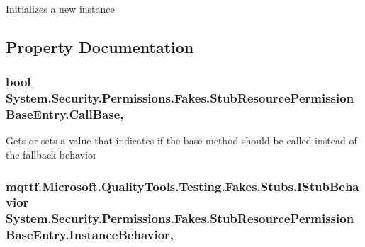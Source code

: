 Initializes a new instance



\subsection{Property Documentation}
\hypertarget{class_system_1_1_security_1_1_permissions_1_1_fakes_1_1_stub_resource_permission_base_entry_aef8fe02ddb10c12f2c7fb5cab6f1fb39}{
\subsubsection[{Call\-Base}]{\setlength{\rightskip}{0pt plus 5cm}bool System.\-Security.\-Permissions.\-Fakes.\-Stub\-Resource\-Permission\-Base\-Entry.\-Call\-Base\hspace{0.3cm}{\ttfamily [get]}, {\ttfamily [set]}}}\label{class_system_1_1_security_1_1_permissions_1_1_fakes_1_1_stub_resource_permission_base_entry_aef8fe02ddb10c12f2c7fb5cab6f1fb39}


Gets or sets a value that indicates if the base method should be called instead of the fallback behavior

\hypertarget{class_system_1_1_security_1_1_permissions_1_1_fakes_1_1_stub_resource_permission_base_entry_ae25d24e5917ed8269055d5e1e2bc7908}{
\subsubsection[{Instance\-Behavior}]{\setlength{\rightskip}{0pt plus 5cm}mqttf.\-Microsoft.\-Quality\-Tools.\-Testing.\-Fakes.\-Stubs.\-I\-Stub\-Behavior System.\-Security.\-Permissions.\-Fakes.\-Stub\-Resource\-Permission\-Base\-Entry.\-Instance\-Behavior\hspace{0.3cm}{\ttfamily [get]}, {\ttfamily [set]}}}\label{class_system_1_1_security_1_1_permissions_1_1_fakes_1_1_stub_resource_permission_base_entry_ae25d24e5917ed8269055d5e1e2bc7908}


